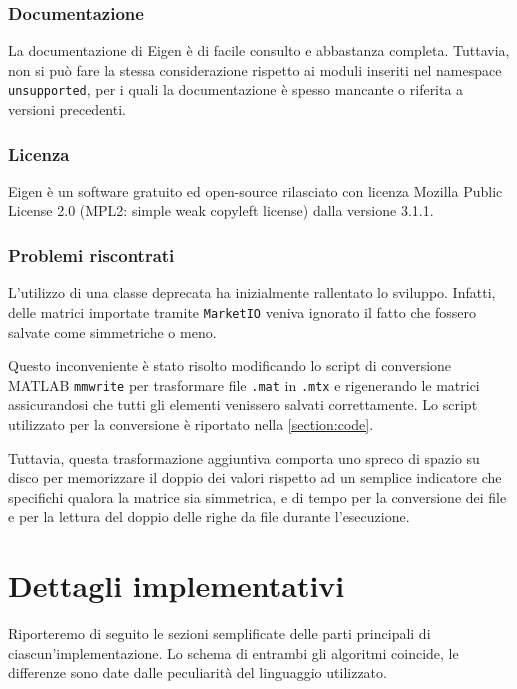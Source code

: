 \documentclass[11pt,italian]{article}
\begin{document}
\subsubsection*{Documentazione}
La documentazione di Eigen è di facile consulto e abbastanza completa. Tuttavia, non si può fare la stessa considerazione rispetto ai moduli inseriti nel namespace \lstinline{unsupported}, per i quali la documentazione è spesso mancante o riferita a versioni precedenti.

\subsubsection*{Licenza}
Eigen è un software gratuito ed open-source rilasciato con licenza Mozilla Public License 2.0 (MPL2: simple weak copyleft license) dalla versione 3.1.1.

\subsubsection*{Problemi riscontrati}
L'utilizzo di una classe deprecata ha inizialmente rallentato lo sviluppo. Infatti, delle matrici importate tramite \lstinline{MarketIO} veniva ignorato il fatto che fossero salvate come simmetriche o meno.

Questo inconveniente è stato risolto modificando lo script di conversione MATLAB \lstinline{mmwrite} per trasformare file \lstinline{.mat} in \lstinline{.mtx} e rigenerando le matrici assicurandosi che tutti gli elementi venissero salvati correttamente.
Lo script utilizzato per la conversione è riportato nella \cref{section:code}.

Tuttavia, questa trasformazione aggiuntiva comporta uno spreco di spazio su disco per memorizzare il doppio dei valori rispetto ad un semplice indicatore che specifichi qualora la matrice sia simmetrica, e di tempo per la conversione dei file e per la lettura del doppio delle righe da file durante l'esecuzione.

\newpage
\section{Dettagli implementativi}
Riporteremo di seguito le sezioni semplificate delle parti principali di ciascun'implementazione.
Lo schema di entrambi gli algoritmi coincide, le differenze sono date dalle peculiarità del linguaggio utilizzato.
\end{document}
